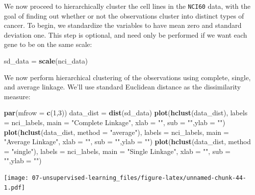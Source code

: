 \documentclass[openany]{book}
\newenvironment{Shaded}{\begin{snugshade}}{\end{snugshade}}
\newcommand{\DataTypeTok}[1]{\textcolor[rgb]{0.13,0.29,0.53}{#1}}
\newcommand{\DecValTok}[1]{\textcolor[rgb]{0.00,0.00,0.81}{#1}}
\newcommand{\KeywordTok}[1]{\textcolor[rgb]{0.13,0.29,0.53}{\textbf{#1}}}
\newcommand{\NormalTok}[1]{#1}
\newcommand{\StringTok}[1]{\textcolor[rgb]{0.31,0.60,0.02}{#1}}
\begin{document}
We now proceed to hierarchically cluster the cell lines in the \texttt{NCI60} data,
with the goal of finding out whether or not the observations cluster into
distinct types of cancer. To begin, we standardize the variables to have
mean zero and standard deviation one. This step is
optional, and need only be performed if we want each gene to be on the
same scale:

\begin{Shaded}
\begin{Highlighting}[]
\NormalTok{sd_data =}\StringTok{ }\KeywordTok{scale}\NormalTok{(nci_data)}
\end{Highlighting}
\end{Shaded}

We now perform hierarchical clustering of the observations using complete,
single, and average linkage. We'll use standard Euclidean distance as the dissimilarity
measure:

\begin{Shaded}
\begin{Highlighting}[]
\KeywordTok{par}\NormalTok{(}\DataTypeTok{mfrow =} \KeywordTok{c}\NormalTok{(}\DecValTok{1}\NormalTok{,}\DecValTok{3}\NormalTok{))}
\NormalTok{data_dist =}\StringTok{ }\KeywordTok{dist}\NormalTok{(sd_data)}
\KeywordTok{plot}\NormalTok{(}\KeywordTok{hclust}\NormalTok{(data_dist), }\DataTypeTok{labels =}\NormalTok{ nci_labels, }\DataTypeTok{main =} \StringTok{"Complete Linkage"}\NormalTok{, }\DataTypeTok{xlab =} \StringTok{""}\NormalTok{, }\DataTypeTok{sub =} \StringTok{""}\NormalTok{,}\DataTypeTok{ylab =} \StringTok{""}\NormalTok{)}
\KeywordTok{plot}\NormalTok{(}\KeywordTok{hclust}\NormalTok{(data_dist, }\DataTypeTok{method =} \StringTok{"average"}\NormalTok{), }\DataTypeTok{labels =}\NormalTok{ nci_labels, }\DataTypeTok{main =} \StringTok{"Average Linkage"}\NormalTok{, }\DataTypeTok{xlab =} \StringTok{""}\NormalTok{, }\DataTypeTok{sub =} \StringTok{""}\NormalTok{,}\DataTypeTok{ylab =} \StringTok{""}\NormalTok{)}
\KeywordTok{plot}\NormalTok{(}\KeywordTok{hclust}\NormalTok{(data_dist, }\DataTypeTok{method =} \StringTok{"single"}\NormalTok{), }\DataTypeTok{labels =}\NormalTok{ nci_labels,  }\DataTypeTok{main =} \StringTok{"Single Linkage"}\NormalTok{, }\DataTypeTok{xlab =} \StringTok{""}\NormalTok{, }\DataTypeTok{sub =} \StringTok{""}\NormalTok{,}\DataTypeTok{ylab =} \StringTok{""}\NormalTok{)}
\end{Highlighting}
\end{Shaded}

\texttt{[image: 07-unsupervised-learning\_files/figure-latex/unnamed-chunk-44-1.pdf]}
\end{document}
